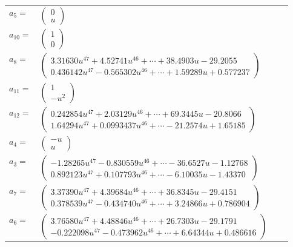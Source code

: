 \documentclass[1p]{elsarticle_modified}
\theoremstyle{definition}
\begin{document}
\begin{tabular}{m{7pt} m{180pt} m{7pt} m{180pt} }
\flushright $a_{5}=$&$\begin{pmatrix}0\\u\end{pmatrix}$ \\
\flushright $a_{10}=$&$\begin{pmatrix}1\\0\end{pmatrix}$ \\
\flushright $a_{8}=$&$\begin{pmatrix}3.31630 u^{47}+4.52741 u^{46}+\cdots+38.4903 u-29.2055\\0.436142 u^{47}-0.565302 u^{46}+\cdots+1.59289 u+0.577237\end{pmatrix}$ \\
\flushright $a_{11}=$&$\begin{pmatrix}1\\- u^2\end{pmatrix}$ \\
\flushright $a_{12}=$&$\begin{pmatrix}0.242854 u^{47}+2.03129 u^{46}+\cdots+69.3445 u-20.8066\\1.64294 u^{47}+0.0993437 u^{46}+\cdots-21.2574 u+1.65185\end{pmatrix}$ \\
\flushright $a_{4}=$&$\begin{pmatrix}- u\\u\end{pmatrix}$ \\
\flushright $a_{3}=$&$\begin{pmatrix}-1.28265 u^{47}-0.830559 u^{46}+\cdots-36.6527 u-1.12768\\0.892123 u^{47}+0.107793 u^{46}+\cdots-6.10035 u-1.43370\end{pmatrix}$ \\
\flushright $a_{7}=$&$\begin{pmatrix}3.37390 u^{47}+4.39684 u^{46}+\cdots+36.8345 u-29.4151\\0.378539 u^{47}-0.434740 u^{46}+\cdots+3.24866 u+0.786904\end{pmatrix}$ \\
\flushright $a_{6}=$&$\begin{pmatrix}3.76580 u^{47}+4.48846 u^{46}+\cdots+26.7303 u-29.1791\\-0.222098 u^{47}-0.473962 u^{46}+\cdots+6.64344 u+0.486616\end{pmatrix}$ \\

\end{tabular}
\end{document}
